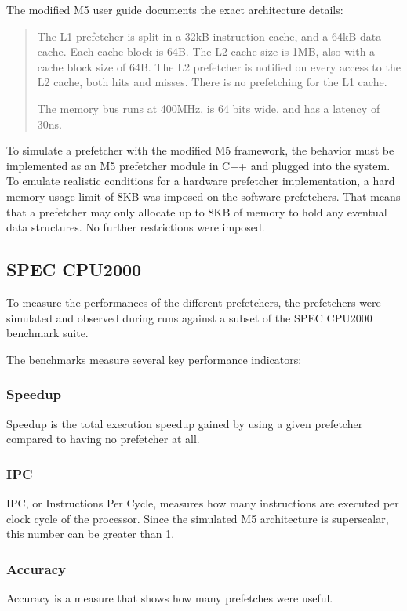 \documentclass[a4paper]{IEEEtran}
\begin{document}
The modified M5 user guide documents the exact architecture details:

\begin{quote}
The L1 prefetcher is split in a 32kB instruction cache, and a 64kB data cache.
Each cache block is 64B.
The L2 cache size is 1MB, also with a cache block size of 64B.
The L2 prefetcher is notified on every access to the L2 cache, both hits and misses.
There is no prefetching for the L1 cache.

The memory bus runs at 400MHz, is 64 bits wide, and has a latency of 30ns.~\cite{m5userguide}
\end{quote}

To simulate a prefetcher with the modified M5 framework, the behavior must be implemented as an M5 prefetcher module in C++ and plugged into the system.
To emulate realistic conditions for a hardware prefetcher implementation, a hard memory usage limit of 8KB was imposed on the software prefetchers.
That means that a prefetcher may only allocate up to 8KB of memory to hold any eventual data structures.
No further restrictions were imposed.

\subsection{SPEC CPU2000}

To measure the performances of the different prefetchers, the prefetchers were simulated and observed during runs against a subset of the SPEC CPU2000 benchmark suite.~\cite{http://dl.acm.org/citation.cfm?id=621510}

The benchmarks measure several key performance indicators:

\subsubsection{Speedup}
Speedup is the total execution speedup gained by using a given prefetcher compared to having no prefetcher at all.

\subsubsection{IPC}
IPC, or Instructions Per Cycle, measures how many instructions are executed per clock cycle of the processor.
Since the simulated M5 architecture is superscalar, this number can be greater than 1.

\subsubsection{Accuracy}
Accuracy is a measure that shows how many prefetches were useful.
\end{document}

